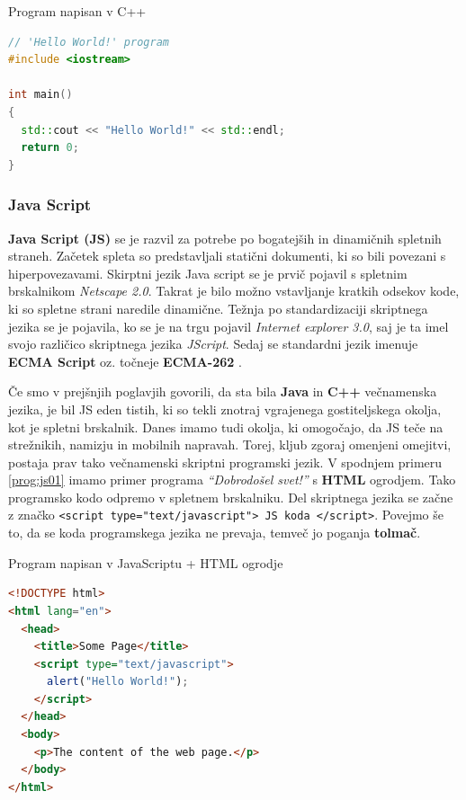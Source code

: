 \begin{examplebox}[label={prog:cpp01}]{Program napisan v C++}
\begin{lstlisting}[language=C++]
// 'Hello World!' program
#include <iostream>

int main()
{
  std::cout << "Hello World!" << std::endl;
  return 0;
}
\end{lstlisting}
\end{examplebox}

\subsubsection{Java Script}
\label{sec:pj_JS}

\textbf{Java Script (JS)} se je razvil za potrebe po bogatejših in dinamičnih
spletnih straneh. Začetek spleta so predstavljali statični dokumenti,
ki so bili povezani s hiperpovezavami. Skirptni jezik Java
script se je prvič pojavil s spletnim brskalnikom \emph{Netscape
  2.0}. Takrat je bilo možno vstavljanje kratkih odsekov kode, ki so
spletne strani naredile dinamične. Težnja po standardizaciji
skriptnega jezika se je pojavila, ko se je na trgu pojavil
\emph{Internet explorer 3.0}, saj je ta imel svojo različico skriptnega
jezika \emph{JScript}. Sedaj se standardni jezik imenuje \textbf{ECMA
  Script} oz. točneje \textbf{ECMA-262} \cite{OO-JS}.

Če smo v prejšnjih poglavjih govorili, da sta bila \textbf{Java} in
\textbf{C++} večnamenska jezika, je bil JS eden tistih, ki so tekli
znotraj vgrajenega gostiteljskega okolja, kot je spletni
brskalnik. Danes imamo tudi okolja, ki omogočajo, da JS teče na
strežnikih, namizju in mobilnih napravah. Torej, kljub zgoraj
omenjeni omejitvi, postaja prav tako večnamenski skriptni programski
jezik. V spodnjem primeru  \ref{prog:js01} imamo primer programa
\emph{``Dobrodošel svet!''} s \textbf{HTML} ogrodjem. Tako programsko
kodo odpremo v spletnem brskalniku. Del skriptnega jezika se začne z
značko \texttt{<script type="text/javascript"> JS koda
  </script>}. Povejmo še to, da se koda programskega jezika ne
prevaja, temveč jo poganja \textbf{tolmač}.


\begin{examplebox}[label={prog:js01}]{Program napisan v JavaScriptu +
    HTML ogrodje}
\begin{lstlisting}[language=Html]
<!DOCTYPE html>
<html lang="en">
  <head>
    <title>Some Page</title>
    <script type="text/javascript">
      alert("Hello World!");
    </script>
  </head>
  <body>
    <p>The content of the web page.</p>
  </body>
</html>
\end{lstlisting}
\end{examplebox}

